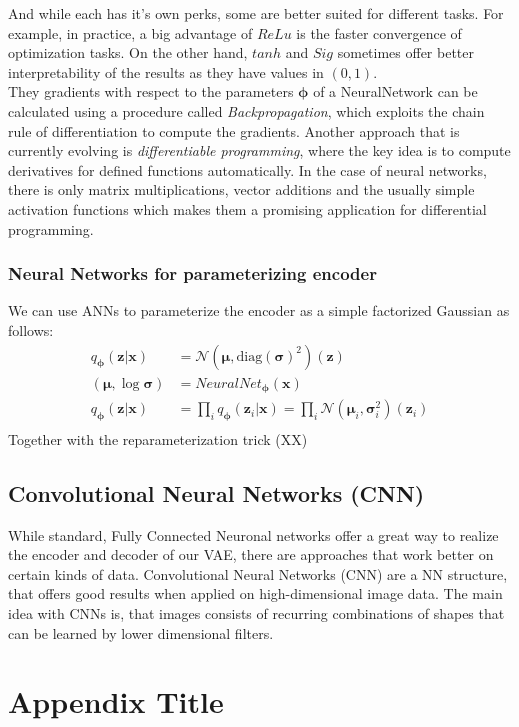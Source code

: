 \documentclass[12pt]{report}
\theoremstyle{definition}
\begin{document}
And while each has it's own perks, some are better suited for different tasks. For example, in practice, a big advantage of $ReLu$ is the faster convergence of optimization tasks. On the other hand, $tanh$ and $Sig$ sometimes offer better interpretability of the results as they have values in $(0, 1)$. \\
They gradients with respect to the parameters $\pmb{\phi}$ of a NeuralNetwork can be calculated using a procedure called \emph{Backpropagation}, which exploits the chain rule of differentiation to compute the gradients. Another approach that is currently evolving is \emph{differentiable programming}, where the key idea is to compute derivatives for defined functions automatically. In the case of neural networks, there is only matrix multiplications, vector additions and the usually simple activation functions which makes them a promising application for differential programming. 

\subsection{Neural Networks for parameterizing encoder}
We can use ANNs to parameterize the encoder as a simple factorized Gaussian as follows:
\begin{equation}
\begin{split}
q_{\pmb{\phi}}(\mathbf{z}|\mathbf{x}) & = \mathcal{N}(\pmb{\mu}, \mathrm{diag}(\pmb{\sigma})^2)(\mathbf{z}) \\
(\pmb{\mu}, \log \pmb{\sigma}) & = NeuralNet_{\pmb{\phi}}(\mathbf{x}) \\
q_{\pmb{\phi}}(\mathbf{z}|\mathbf{x}) & = \prod_i q_{\pmb{\phi}}(\mathbf{z}_i|\mathbf{x}) = \prod_i \mathcal{N}(\pmb{\mu}_i, \pmb{\sigma}_i^2)(\mathbf{z}_i)\\
\end{split}
\end{equation}
Together with the reparameterization trick (XX) %




\section{Convolutional Neural Networks (CNN)}
While standard, Fully Connected Neuronal networks offer a great way to realize the encoder and decoder of our VAE, there are approaches that work better on certain kinds of data. Convolutional Neural Networks (CNN) are a NN structure, that offers good results when applied on high-dimensional image data. The main idea with CNNs is, that images consists of recurring combinations of shapes that can be learned by lower dimensional filters. %

\appendix
\chapter{Appendix Title}
%
\end{document}
